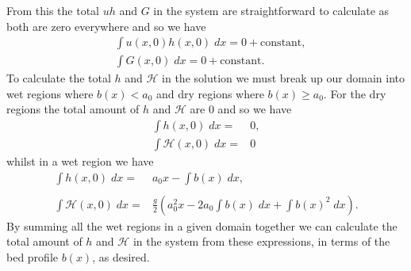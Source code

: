 From this the total $uh$ and $G$ in the system are straightforward to calculate as both are zero everywhere and so we have 
\begin{subequations}
	\label{eqn:AppLARu}
\begin{align}
&\int u(x,0)h(x,0) \;  dx = {} 0 + \text{constant}, \\
&\int G(x,0) \; dx = {} 0 + \text{constant}.
\end{align}
\end{subequations}
To calculate the total $h$ and $\mathcal{H}$ in the solution we must break up our domain into wet regions where $b(x) < a_0$ and dry regions where $b(x) \ge a_0$. For the dry regions the total amount of $h$ and $\mathcal{H}$ are $0$ and so we have 
\begin{subequations}
	\label{eqn:AppLARhdry}
	\begin{align}
	\int h(x,0) \; dx = {} & 0 , \\
	\int \mathcal{H}(x,0) \; dx = {} & 0
	\end{align}
\end{subequations}
whilst in a wet region we have 
\begin{subequations}
	\label{eqn:AppLARhwet}
	\begin{align}
	\int h(x,0) \; dx = {} & a_0 x -  \int b(x) \; dx , \\  \nonumber \\
	\int \mathcal{H}(x,0) \; dx = {} & \frac{g}{2} \left(a_0^2x  -  2a_0 \int b(x) \; dx + \int b(x)^2 \; dx \right).
	\end{align}
\end{subequations}
By summing all the wet regions in a given domain together we can calculate the total amount of $h$ and $\mathcal{H}$ in the system from these expressions, in terms of the bed profile $b(x)$, as desired. 

